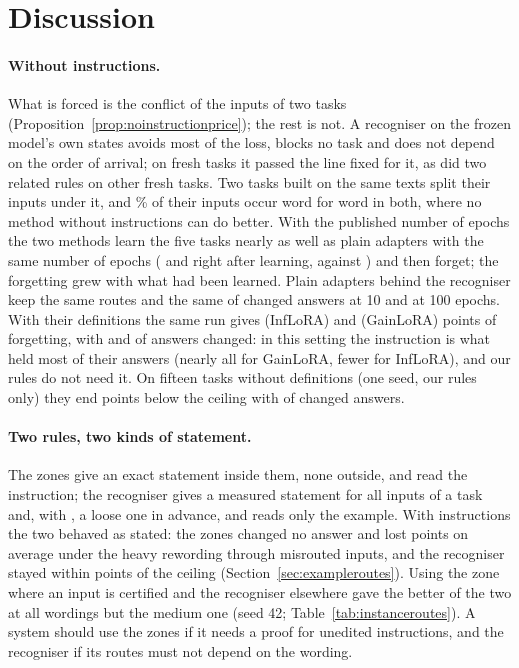 \section{Discussion}
\label{sec:discussion}

\paragraph{Without instructions.} What is forced is the conflict of the inputs of two tasks
(Proposition~\ref{prop:noinstructionprice}); the rest is not. A recogniser on the frozen model's own
states avoids most of the loss, blocks no task and does not depend on the order of arrival; on fresh tasks it passed the line fixed for it, as did two related rules on other fresh tasks. Two tasks
built on the same texts split their inputs under it, and \AudConfPairShare{}\% of their inputs occur
word for word in both, where no method without instructions can do better. With the published number
of epochs the two methods learn the five tasks nearly as well as plain adapters with the same number of epochs (\AudFullInfloraLearned{}
and \AudFullGainloraLearned{} right after learning, against \AudFullOursRidgeLearned{}) and then forget; the
forgetting grew with what had been learned. Plain adapters behind the recogniser keep the same routes
and the same \AudFullOursRidgeChanged{} of \AudFullCompared{} changed answers at 10 and at 100 epochs. With their definitions the same run gives \AudFullDefOriginalInfloraFT{} (InfLoRA) and \AudFullDefOriginalGainloraFT{} (GainLoRA) points of forgetting, with \AudFullDefOriginalInfloraChanged{} and \AudFullDefOriginalGainloraChanged{} of \AudFullDefCompared{} answers changed: in this setting the instruction is what held most of their answers (nearly all for GainLoRA, fewer for InfLoRA), and our rules do not need it.
On fifteen tasks without definitions (one seed, our rules only) they end
\AudFifteenNoDefRidgeBelowOwn{} points below the ceiling with \AudFifteenNoDefRidgeChanged{} of
\AudFifteenNoDefCompared{} changed answers.

\paragraph{Two rules, two kinds of statement.} The zones give an exact statement inside them, none
outside, and read the instruction; the recogniser gives a measured statement for all inputs of a task
and, with \handicap{}, a loose one in advance, and reads only the example. With instructions the two
behaved as stated: the zones changed no answer and lost \AudUThreeHeavyCertBelowOwn{} points on average
under the heavy rewording through misrouted inputs, and the recogniser stayed within
\AudUThreeRidgeBelowOwnHigh{} points of the ceiling (Section~\ref{sec:exampleroutes}). Using the zone
where an input is certified and the recogniser elsewhere gave the better of the two at all wordings but
the medium one (seed 42; Table~\ref{tab:instanceroutes}). A system should use the zones if it needs a
proof for unedited instructions, and the recogniser if its routes must not depend on the wording.

